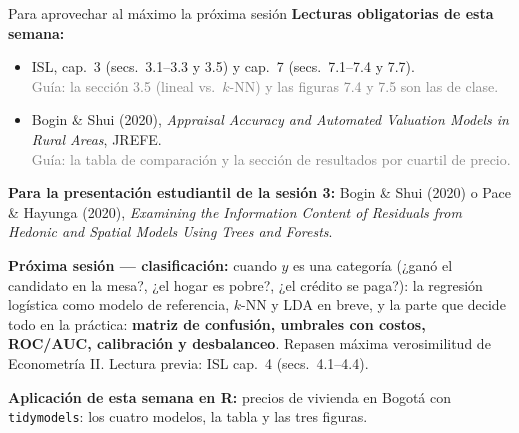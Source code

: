 \documentclass{beamer}
\newcommand{\1}{\mathbb{I}}
\begin{document}
\begin{frame}{Para aprovechar al máximo la próxima sesión}
\small
\textbf{Lecturas obligatorias de esta semana:}
\begin{itemize}\itemsep4pt
  \item ISL, cap.\ 3 (secs.\ 3.1--3.3 y 3.5) y cap.\ 7 (secs.\ 7.1--7.4 y 7.7). \\ \textcolor{gray}{Guía: la sección 3.5 (lineal vs.\ $k$-NN) y las figuras 7.4 y 7.5 son las de clase.}
  \item Bogin \& Shui (2020), \emph{Appraisal Accuracy and Automated Valuation Models in Rural Areas}, JREFE. \\ \textcolor{gray}{Guía: la tabla de comparación y la sección de resultados por cuartil de precio.}
\end{itemize}

\textbf{Para la presentación estudiantil de la sesión 3:} Bogin \& Shui (2020) o Pace \& Hayunga (2020), \emph{Examining the Information Content of Residuals from Hedonic and Spatial Models Using Trees and Forests}.
\pause

\vspace{0.1cm}
\textbf{Próxima sesión --- clasificación:} cuando $y$ es una categoría (¿ganó el candidato en la mesa?, ¿el hogar es pobre?, ¿el crédito se paga?): la regresión logística como modelo de referencia, $k$-NN y LDA en breve, y la parte que decide todo en la práctica: \textbf{matriz de confusión, umbrales con costos, ROC/AUC, calibración y desbalanceo}. Repasen máxima verosimilitud de Econometría II. Lectura previa: ISL cap.\ 4 (secs.\ 4.1--4.4).
\pause

\vspace{0.1cm}
\textbf{Aplicación de esta semana en R:} precios de vivienda en Bogotá con \texttt{tidymodels}: los cuatro modelos, la tabla y las tres figuras.
\end{frame}
\end{document}
